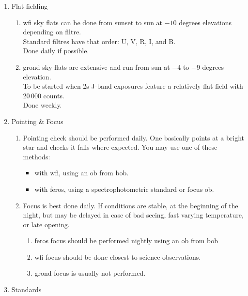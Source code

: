 \documentclass[11pt,fleqn,a4paper]{book}
\begin{document}
\begin{enumerate}
    \item Flat-fielding
    \begin{enumerate}
        \item \gls{wfi} \gls{sky flats} can be done from sunset to sun at $-10$ degrees elevations depending on filtre.\\
        Standard filtres have that order: U, V, R, I, and B.\\
        Done daily if possible.
        \item \gls{grond} \gls{sky flats} are extensive and run from sun at $-4$ to $-9$ degrees elevation.\\
        To be started when 2s J-band exposures feature a
        relatively flat field with 20\,000 counts.\\
        Done weekly.
    \end{enumerate}
    \item Pointing \& Focus
    \begin{enumerate}
        \item Pointing check should be performed daily.  One basically points at
        a bright star and checks it falls where expected.  You may use
        one of these methods:
        \begin{itemize} 
            \item with \gls{wfi}, using an \gls{ob} from \gls{bob}.
            \item with \gls{feros}, using a \gls{spectrophotometric standard} or \gls{focus} \gls{ob}.
        \end{itemize}
        \item Focus is best done daily.  If conditions are stable, at the beginning of the night, but may be delayed in case of bad seeing, fast varying temperature, or late opening.  
        \begin{enumerate}
            \item \gls{feros} \gls{focus} should be performed nightly using an \gls{ob} from \gls{bob}
            \item \gls{wfi} \gls{focus} should be done closest to science observations.
            \item \gls{grond} \gls{focus} is usually not performed.
        \end{enumerate}
    \end{enumerate} 
    \item Standards
    \begin{enumerate}

\end{enumerate}
\end{enumerate}
\end{document}
